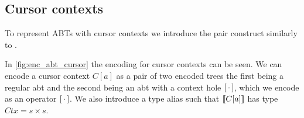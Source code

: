 \documentclass[sigplan,review]{acmart}
\newcommand{\abt}{\textsf{abt}\xspace}
\begin{document}
\subsection{Cursor contexts}\label{sec:enc_cursor_contexts}

To represent ABTs with cursor contexts we introduce the pair construct similarly to \cite{types_programming_languages}.


In \cref{fig:enc_abt_cursor} the encoding for cursor contexts can be seen. We can encode a cursor context $C[a]$ as a pair of two encoded trees the first being a regular \abt and the second being an \abt with a context hole $[ \, \cdot \, ]$, which we encode as an operator $[ \, \cdot \, ]$. We also introduce a type alias such that $\llbracket C[a] \rrbracket$ has type $Ctx = s \times s$.

    
\end{document}
